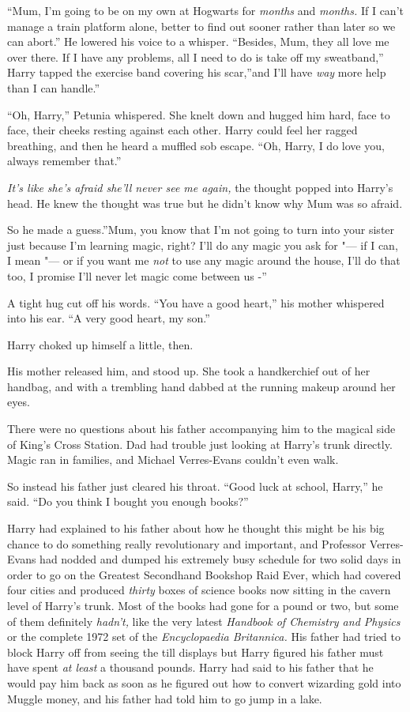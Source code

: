 ``Mum, I'm going to be on my own at Hogwarts for \emph{months} and
\emph{months.} If I can't manage a train platform alone, better to find
out sooner rather than later so we can abort.'' He lowered his voice to
a whisper. ``Besides, Mum, they all love me over there. If I have any
problems, all I need to do is take off my sweatband,'' Harry tapped the
exercise band covering his scar,''and I'll have \emph{way} more help
than I can handle.''

``Oh, Harry,'' Petunia whispered. She knelt down and hugged him hard,
face to face, their cheeks resting against each other. Harry could feel
her ragged breathing, and then he heard a muffled sob escape. ``Oh,
Harry, I do love you, always remember that.''

\emph{It's like she's afraid she'll never see me again,} the thought
popped into Harry's head. He knew the thought was true but he didn't
know why Mum was so afraid.

So he made a guess.''Mum, you know that I'm not going to turn into your
sister just because I'm learning magic, right? I'll do any magic you ask
for "--- if I can, I mean "--- or if you want me \emph{not} to use any magic
around the house, I'll do that too, I promise I'll never let magic come
between us -''

A tight hug cut off his words. ``You have a good heart,'' his mother
whispered into his ear. ``A very good heart, my son.''

Harry choked up himself a little, then.

His mother released him, and stood up. She took a handkerchief out of
her handbag, and with a trembling hand dabbed at the running makeup
around her eyes.

There were no questions about his father accompanying him to the magical
side of King's Cross Station. Dad had trouble just looking at Harry's
trunk directly. Magic ran in families, and Michael Verres-Evans couldn't
even walk.

So instead his father just cleared his throat. ``Good luck at school,
Harry,'' he said. ``Do you think I bought you enough books?''

Harry had explained to his father about how he thought this might be his
big chance to do something really revolutionary and important, and
Professor Verres-Evans had nodded and dumped his extremely busy schedule
for two solid days in order to go on the Greatest Secondhand Bookshop
Raid Ever, which had covered four cities and produced \emph{thirty}
boxes of science books now sitting in the cavern level of Harry's trunk.
Most of the books had gone for a pound or two, but some of them
definitely \emph{hadn't,} like the very latest \emph{Handbook of
Chemistry and Physics} or the complete 1972 set of the
\emph{Encyclopaedia Britannica.} His father had tried to block Harry off
from seeing the till displays but Harry figured his father must have
spent \emph{at least} a thousand pounds. Harry had said to his father
that he would pay him back as soon as he figured out how to convert
wizarding gold into Muggle money, and his father had told him to go jump
in a lake.

